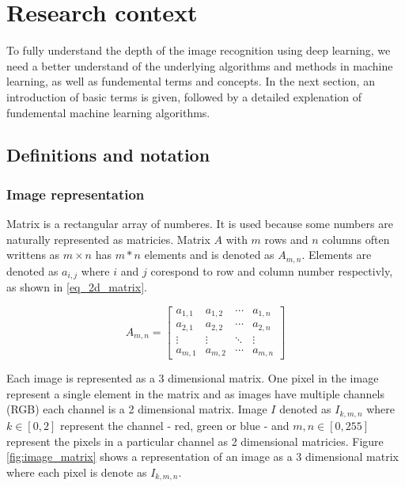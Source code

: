 \documentclass[times, utf8, diplomski]{fer}
\begin{document}
\chapter{Research context}
To fully understand the depth of the image recognition using deep learning, we need a better understand of the underlying algorithms and methods in machine learning, as well as fundemental terms and concepts. In the next section, an introduction of basic terms is given, followed by a detailed explenation of fundemental machine learning algorithms.

\section{Definitions and notation}

\subsection{Image representation}
Matrix is a rectangular array of numberes. It is used because some numbers are naturally represented as matricies. Matrix $A$ with $m$ rows and $n$ columns often writtens as $m \times n$ has $m*n$ elements and is denoted as $A_{m,n}$. Elements are denoted as $a_{i,j}$ where $i$ and $j$ corespond to row and column number respectivly, as shown in \ref{eq_2d_matrix}. 

\begin{equation} \label{eq_2d_matrix}
A_{m,n} = 
 \begin{bmatrix}
  a_{1,1} & a_{1,2} & \cdots & a_{1,n} \\
  a_{2,1} & a_{2,2} & \cdots & a_{2,n} \\
  \vdots  & \vdots  & \ddots & \vdots  \\
  a_{m,1} & a_{m,2} & \cdots & a_{m,n} 
 \end{bmatrix}
\end{equation}


Each image is represented as a 3 dimensional matrix. One pixel in the image represent a single element in the matrix and as images have multiple channels (RGB) each channel is a 2 dimensional matrix. Image $I$ denoted as $I_{k,m,n}$ where $k\in[0,2]$ represent the channel - red, green or blue - and $m,n\in[0,255]$ represent the pixels in a particular channel as 2 dimensional matricies. Figure \ref{fig:image_matrix} shows a representation of an image as a 3 dimensional matrix where each pixel is denote as $I_{k,m,n}$.
\end{document}
